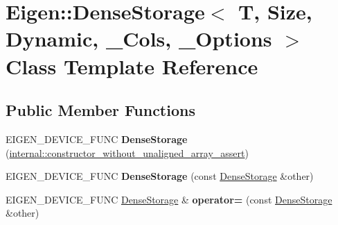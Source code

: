 \hypertarget{class_eigen_1_1_dense_storage_3_01_t_00_01_size_00_01_dynamic_00_01___cols_00_01___options_01_4}{}\section{Eigen\+:\+:Dense\+Storage$<$ T, Size, Dynamic, \+\_\+\+Cols, \+\_\+\+Options $>$ Class Template Reference}
\label{class_eigen_1_1_dense_storage_3_01_t_00_01_size_00_01_dynamic_00_01___cols_00_01___options_01_4}
\subsection*{Public Member Functions}
\begin{DoxyCompactItemize}
\item 
\mbox{\label{class_eigen_1_1_dense_storage_3_01_t_00_01_size_00_01_dynamic_00_01___cols_00_01___options_01_4_a3ab59c2d4d00d134e177f5f6ac2f3240}} 
E\+I\+G\+E\+N\+\_\+\+D\+E\+V\+I\+C\+E\+\_\+\+F\+U\+NC {\bfseries Dense\+Storage} (\hyperlink{struct_eigen_1_1internal_1_1constructor__without__unaligned__array__assert}{internal\+::constructor\+\_\+without\+\_\+unaligned\+\_\+array\+\_\+assert})
\item 
\mbox{\label{class_eigen_1_1_dense_storage_3_01_t_00_01_size_00_01_dynamic_00_01___cols_00_01___options_01_4_a26fbde591528002a057baf1278f8056d}} 
E\+I\+G\+E\+N\+\_\+\+D\+E\+V\+I\+C\+E\+\_\+\+F\+U\+NC {\bfseries Dense\+Storage} (const \hyperlink{class_eigen_1_1_dense_storage}{Dense\+Storage} \&other)
\item 
\mbox{\label{class_eigen_1_1_dense_storage_3_01_t_00_01_size_00_01_dynamic_00_01___cols_00_01___options_01_4_ab60f99a602f18548d68403c6dc294e02}} 
E\+I\+G\+E\+N\+\_\+\+D\+E\+V\+I\+C\+E\+\_\+\+F\+U\+NC \hyperlink{class_eigen_1_1_dense_storage}{Dense\+Storage} \& {\bfseries operator=} (const \hyperlink{class_eigen_1_1_dense_storage}{Dense\+Storage} \&other)
\item 
\mbox{\label{class_eigen_1_1_dense_storage_3_01_t_00_01_size_00_01_dynamic_00_01___cols_00_01___options_01_4_a7f0de5d9afca92c957a86fd170f3a1b2}} 

\end{DoxyCompactItemize}
